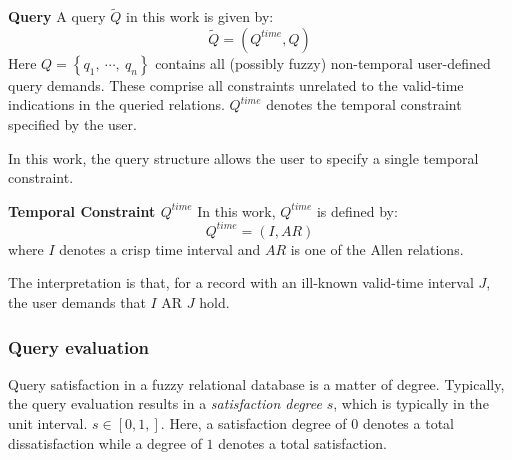 \begin{svgraybox}
\vspace{-10pt}
\begin{definition}
\textbf{Query}
A query $\tilde{Q}$ in this work is given by:
\begin{equation}
\label{eq:query-specification}
\tilde{Q} = \left( Q^{time}, Q \right)
\end{equation}
Here $Q = \left \lbrace q_1,\ \cdots,\ q_n \right \rbrace$ contains all (possibly fuzzy) non-temporal user-defined query demands. These comprise all constraints unrelated to the valid-time indications in the queried relations. $Q^{time}$ denotes the temporal constraint specified by the user.
\end{definition}
\vspace{-10pt}
\end{svgraybox}

In this work, the query structure allows the user to specify a single temporal constraint.

\begin{svgraybox}
\vspace{-10pt}
\begin{definition}
\textbf{Temporal Constraint $Q^{time}$}
In this work, $Q^{time}$ is defined by:
\begin{equation}
Q^{time} = \left( I,AR \right)
\end{equation}
where $I$ denotes a crisp time interval and $AR$ is one of the Allen relations.
\end{definition}
\vspace{-10pt}
\end{svgraybox}

The interpretation is that, for a record with an ill-known valid-time interval $J$, the user demands that $I$ AR $J$ hold.

\subsubsection{Query evaluation}
\label{subsubsec:query-evaluation}
Query satisfaction in a fuzzy relational database is a matter of degree. Typically, the query evaluation results in a \emph{satisfaction degree} $s$, which is typically in the unit interval. $s \in \left[ 0,1,\right]$. Here, a satisfaction degree of $0$ denotes a total dissatisfaction while a degree of $1$ denotes a total satisfaction.

